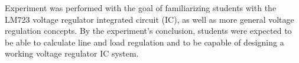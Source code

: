 Experiment was performed with the goal of familiarizing students with the LM723
voltage regulator integrated circuit (IC), as well as more general voltage
regulation concepts.  By the experiment's conclusion, students were expected to
be able to calculate line and load regulation and to be capable of designing a
working voltage regulator IC system.
